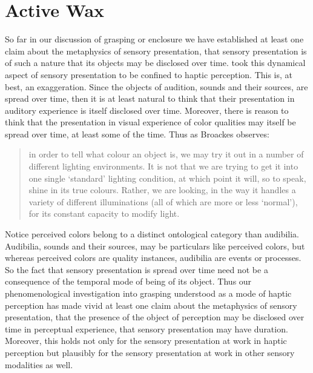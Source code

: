 \documentclass[12pt]{article}
\begin{document}
\section{Active Wax} %
\label{sec:active_wax}

So far in our discussion of grasping or enclosure we have established at least one claim about the metaphysics of sensory presentation, that sensory presentation is of such a nature that its objects may be disclosed over time. \citet{Broad:1952kx} took this dynamical aspect of sensory presentation to be confined to haptic perception. This is, at best, an exaggeration. Since the objects of audition, sounds and their sources, are spread over time, then it is at least natural to think that their presentation in auditory experience is itself disclosed over time. Moreover, there is reason to think that the presentation in visual experience of color qualities may itself be spread over time, at least some of the time. Thus as Broackes observes: 
\begin{quote}
	in order to tell what colour an object is, we may try it out in a number of different lighting environments. It is not that we are trying to get it into one single `standard' lighting condition, at which point it will, so to speak, shine in its true colours. Rather, we are looking, in the way it handles a variety of different illuminations (all of which are more or less `normal'), for its constant capacity to modify light. \citep[215]{Broackes:1997pa}
\end{quote}
Notice perceived colors belong to a distinct ontological category than audibilia. Audibilia, sounds and their sources, may be particulars like perceived colors, but whereas perceived colors are quality instances, audibilia are events or processes. So the fact that sensory presentation is spread over time need not be a consequence of the temporal mode of being of its object. Thus our phenomenological investigation into grasping understood as a mode of haptic perception has made vivid at least one claim about the metaphysics of sensory presentation, that the presence of the object of perception may be disclosed over time in perceptual experience, that sensory presentation may have duration. Moreover, this holds not only for the sensory presentation at work in haptic perception but plausibly for the sensory presentation at work in other sensory modalities as well.
\end{document}
